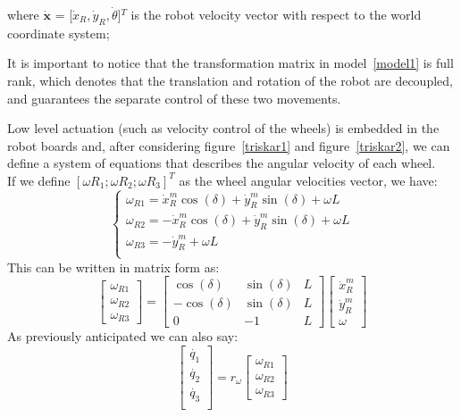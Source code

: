 where $\mathbf{\dot{x}}$ = [$\dot{x}_R,\dot{y}_R,\dot{\theta}$]$^T$ is the robot velocity vector with respect to the world coordinate system;

It is important to notice that the transformation matrix in model~\ref{model1} is full rank, which denotes that the translation and rotation of the robot are decoupled, and guarantees the separate control of these two movements.

Low level actuation (such as velocity control of the wheels) is embedded in the robot boards and, after considering figure~\ref{triskar1} and figure~\ref{triskar2}, we can define a system of equations that describes the angular velocity of each wheel.\\	
If we define $[\omega R_1; \omega R_2; \omega R_3]^T$ as the wheel angular velocities vector, we have:
\begin{equation}
\begin{cases} 

\omega_{R1} = \dot{x}^m_R\cos(\delta)+\dot{y}^m_R\sin(\delta)+ \omega L\\ 
\omega_{R2} = -\dot{x}^m_R\cos(\delta)+\dot{y}^m_R\sin(\delta)+\omega L\\ 
\omega_{R3} = -\dot{y}^m_R +  \omega L \\ 
\end{cases} 
\end{equation}
This can be written in matrix form as:
\begin{equation}
\begin{bmatrix}
\omega_{R1}\\
\omega_{R2}\\
\omega_{R3}
\end{bmatrix} = 
\begin{bmatrix}
\cos(\delta) & \sin(\delta) & L \\
-\cos(\delta) & \sin(\delta) & L \\
0 & -1 & L
\end{bmatrix}
\begin{bmatrix}
\dot{x}^m_R\\
\dot{y}^m_R\\
\omega
\end{bmatrix}
\end{equation} 
As previously anticipated we can also say:
\begin{equation}
\begin{bmatrix}
\dot{q_1}\\
\dot{q_2}\\
\dot{q_3}\\
\end{bmatrix} = 
r_\omega
\begin{bmatrix}
\omega_{R1}\\
\omega_{R2}\\
\omega_{R3}
\end{bmatrix}
\end{equation}
